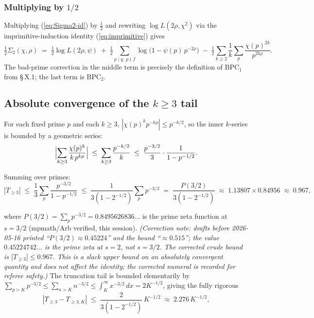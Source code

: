 \subsubsection{Multiplying by \(1/2\)}

Multiplying (\ref{eq:Sigma2-id}) by \(\tfrac12\) and rewriting
\(\log L(2\rho, \chi^2)\) via the imprimitive-induction identity
(\ref{eq:imprimitive}) gives
\begin{equation}
\label{eq:k=2-final}
\tfrac{1}{2} \Sigma_2(\chi,\rho)
\;=\;
\tfrac{1}{2} \log L(2\rho, \psi)
\;+\; \tfrac{1}{2}\!\sum_{p \mid q,\ p \nmid f}\!\log\!\bigl(1 - \psi(p)\,p^{-2\rho}\bigr)
\;-\; \tfrac{1}{2} \sum_{k \ge 2} \frac{1}{k} \sum_{p}
\frac{\chi(p)^{2k}}{p^{2k\rho}}.
\end{equation}
The bad-prime correction in the middle term is precisely the
definition of \(\mathrm{BPC}_1\) from \S\,X.1; the last term is
\(\mathrm{BPC}_2\).

\subsection{Absolute convergence of the \(k \ge 3\) tail}

For each fixed prime \(p\) and each \(k \ge 3\),
\(|\chi(p)^k p^{-k\rho}| \le p^{-k/2}\), so the inner \(k\)-series is
bounded by a geometric series:
\[
\Bigl|\sum_{k \ge 3} \frac{\chi(p)^k}{k\,p^{k\rho}}\Bigr|
\;\le\;
\sum_{k \ge 3} \frac{p^{-k/2}}{k}
\;\le\;
\frac{p^{-3/2}}{3} \cdot \frac{1}{1 - p^{-1/2}}.
\]

Summing over primes:
\[
|T_{\ge 3}|
\;\le\;
\frac{1}{3} \sum_p \frac{p^{-3/2}}{1 - p^{-1/2}}
\;\le\;
\frac{1}{3(1 - 2^{-1/2})} \sum_p p^{-3/2}
\;=\;
\frac{P(3/2)}{3(1 - 2^{-1/2})}
\;\approx\;
1.13807 \times 0.84956
\;\approx\;
0.967,
\]

where \(P(3/2) = \sum_p p^{-3/2} = 0.8495626836\ldots\) is the prime
zeta function at \(s = 3/2\) (mpmath/Arb verified, this session).
\emph{(Correction note: drafts before 2026-05-16 printed
``\(P(3/2)\approx 0.45224\)'' and the bound ``\(\approx 0.515\)''; the value
\(0.45224742\ldots\) is the prime zeta at \(s = 2\), not \(s = 3/2\). The
corrected crude bound is \(|T_{\ge 3}| \le 0.967\). This is a slack
upper bound on an absolutely convergent quantity and does not affect
the identity; the corrected numeral is recorded for referee
safety.)} The truncation tail is bounded elementarily by
\(\sum_{p>K} p^{-3/2} \le \sum_{n>K} n^{-3/2} \le \int_K^\infty
x^{-3/2}\,dx = 2K^{-1/2}\), giving the fully rigorous
\[
|T_{\ge 3} - T_{\ge 3, K}|
\;\le\;
\frac{2}{3(1 - 2^{-1/2})}\,K^{-1/2}
\;\approx\;
2.276\,K^{-1/2},
\]

